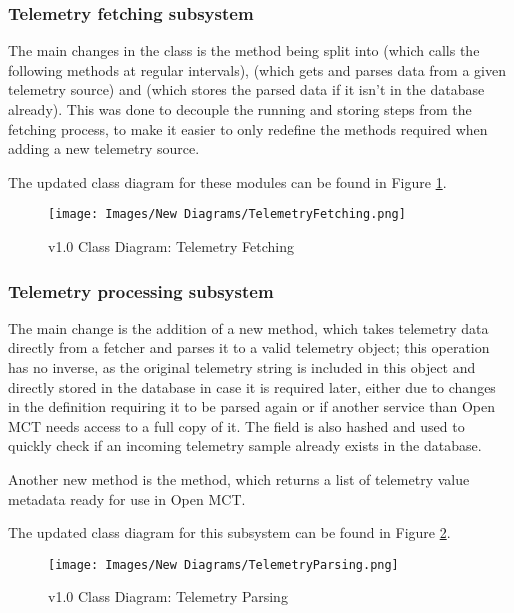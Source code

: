 \subsubsection{Telemetry fetching subsystem}
The main changes in the  class is the  method being split into  (which calls the following methods at regular intervals),  (which gets and parses data from a given telemetry source) and  (which stores the parsed data if it isn't in the database already). This was done to decouple the running and storing steps from the fetching process, to make it easier to only redefine the methods required when adding a new telemetry source.

The updated class diagram for these modules can be found in Figure \ref{fig:new_cdfetching}.

\begin{figure}[H]
  \centering
  \texttt{[image: Images/New Diagrams/TelemetryFetching.png]}
  \caption{v1.0 Class Diagram: Telemetry Fetching}
  \label{fig:new_cdfetching}
\end{figure}

\subsubsection{Telemetry processing subsystem}
The main change is the addition of a new  method, which takes telemetry data directly from a fetcher and parses it to a valid telemetry object; this operation has no inverse, as the original telemetry string is included in this object and directly stored in the database in case it is required later, either due to changes in the definition requiring it to be parsed again or if another service than Open MCT needs access to a full copy of it. The field is also hashed and used to quickly check if an incoming telemetry sample already exists in the database.

Another new method is the  method, which returns a list of telemetry value metadata ready for use in Open MCT.

The updated class diagram for this subsystem can be found in Figure \ref{fig:new_cdparsing}.

\begin{figure}[H]
  \centering
  \texttt{[image: Images/New Diagrams/TelemetryParsing.png]}
  \caption{v1.0 Class Diagram: Telemetry Parsing}
  \label{fig:new_cdparsing}
\end{figure}

